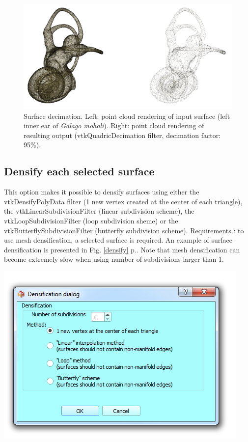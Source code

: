 \begin{figure}
  \centering
  \includegraphics[scale=0.35]{images/09/structure/decimation_example.png} 
	\caption{Surface decimation. Left: point cloud rendering of input surface (left inner ear of \textit{Galago moholi}). Right: point cloud rendering of resulting output (vtkQuadricDecimation filter,
decimation factor: 95\%). 
}
\label{decimate}
 
\end{figure}

\subsection{Densify each selected surface}

\noindent
\begin{minipage}{0.5\textwidth}

This option makes it possible to densify surfaces using either the vtkDensifyPolyData filter (1 new vertex created at the center of each triangle), the vtkLinearSubdivisionFilter (linear subdivision scheme), the vtkLoopSubdivisionFilter (loop subdivision sheme) or the vtkButterflySubdivisionFilter (butterfly subdivision scheme).
Requirements : to use mesh densification, a selected
surface is required. An example of surface densification is presented in Fig. \ref{densify} p.\pageref{densify}.
Note that mesh densification can become extremely slow
when using number of subdivisions larger than 1.

\end{minipage}    
\begin{minipage}{0.5\textwidth}\centering
  \includegraphics[scale=0.5]{images/09/structure/densification_dialog.png}
 \end{minipage} 
\noindent

